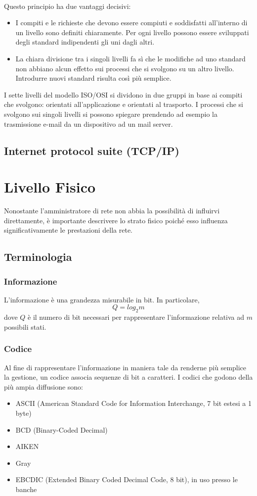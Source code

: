 \documentclass[a4paper,11pt]{article}
\def\sec#1{\section{#1}\label{#1}}
\def\sub#1{\subsection{#1}\label{#1}}
\def\subsub#1{\subsubsection{#1}\label{#1}}
\begin{document}
\\Questo principio ha due vantaggi decisivi:
\begin{itemize}
	\item I compiti e le richieste che devono essere compiuti e soddisfatti all’interno di un livello sono definiti chiaramente. Per ogni livello possono essere sviluppati degli standard indipendenti gli uni dagli altri.
	\item La chiara divisione tra i singoli livelli fa sì che le modifiche ad uno standard non abbiano alcun effetto sui processi che si svolgono su un altro livello. Introdurre nuovi standard risulta così più semplice.
\end{itemize}
I sette livelli del modello ISO/OSI si dividono in due gruppi in base ai compiti che svolgono: orientati all’applicazione e orientati al trasporto. I processi che si svolgono sui singoli livelli si possono spiegare prendendo ad esempio la trasmissione e-mail da un dispositivo ad un mail server.

\sub{Internet protocol suite (TCP/IP)}

\newpage

\sec{Livello Fisico}
Nonostante l'amministratore di rete non abbia la possibilità di influirvi direttamente, è importante descrivere lo strato fisico poiché esso influenza significativamente le prestazioni della rete.

\subsection{Terminologia}
\subsub{Informazione} 
L'informazione è una grandezza misurabile in bit. In particolare, \[Q=log_{2}m\] dove $Q$ è il numero di bit necessari per rappresentare l'informazione relativa ad $m$ possibili stati. 

\subsub{Codice}
Al fine di rappresentare l'informazione in maniera tale da renderne più semplice la gestione, un codice associa sequenze di bit a caratteri. I codici che godono della più ampia diffusione sono:
\begin{itemize}
\item ASCII (American Standard Code for Information Interchange, 7 bit estesi a 1 byte)
\item BCD (Binary-Coded Decimal)
\item AIKEN 
\item Gray
\item EBCDIC (Extended Binary Coded Decimal Code, 8 bit), in uso presso le banche
\end{itemize}
\end{document}
